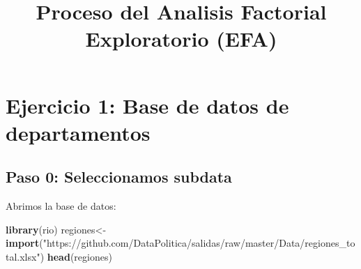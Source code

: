 \documentclass[
]{article}
\title{Proceso del Analisis Factorial Exploratorio (EFA)}
\author{}
\date{\vspace{-2.5em}}
\newenvironment{Shaded}{\begin{snugshade}}{\end{snugshade}}
\newcommand{\KeywordTok}[1]{\textcolor[rgb]{0.13,0.29,0.53}{\textbf{#1}}}
\newcommand{\NormalTok}[1]{#1}
\newcommand{\StringTok}[1]{\textcolor[rgb]{0.31,0.60,0.02}{#1}}
\begin{document}
\maketitle

\hypertarget{ejercicio-1-base-de-datos-de-departamentos}{%
\section{Ejercicio 1: Base de datos de
departamentos}\label{ejercicio-1-base-de-datos-de-departamentos}}

\hypertarget{paso-0-seleccionamos-subdata}{%
\subsection{Paso 0: Seleccionamos
subdata}\label{paso-0-seleccionamos-subdata}}

Abrimos la base de datos:

\begin{Shaded}
\begin{Highlighting}[]
\KeywordTok{library}\NormalTok{(rio)}
\NormalTok{regiones<-}\StringTok{ }\KeywordTok{import}\NormalTok{(}\StringTok{"https://github.com/DataPolitica/salidas/raw/master/Data/regiones_total.xlsx"}\NormalTok{)}
\KeywordTok{head}\NormalTok{(regiones)}
\end{Highlighting}
\end{Shaded}
\end{document}
